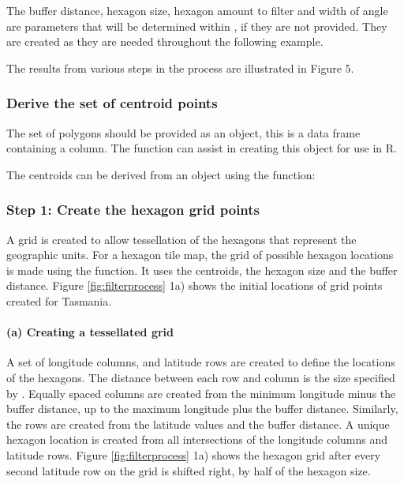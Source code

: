 The buffer distance, hexagon size, hexagon amount to filter and width of
angle are parameters that will be determined within
, if they are not provided. They are created as
they are needed throughout the following example.

The results from various steps in the process are illustrated in Figure
5.

\hypertarget{derive-the-set-of-centroid-points}{%
\subsubsection{Derive the set of centroid
points}\label{derive-the-set-of-centroid-points}}

The set of polygons should be provided as an  object, this is a
data frame containing a  column. The 
function can assist in creating this object for use in R.

The centroids can be derived from an  object using the
 function:

\hypertarget{step-1-create-the-hexagon-grid-points}{%
\subsubsection{Step 1: Create the hexagon grid
points}\label{step-1-create-the-hexagon-grid-points}}

A grid is created to allow tessellation of the hexagons that represent
the geographic units. For a hexagon tile map, the grid of possible
hexagon locations is made using the  function. It
uses the centroids, the hexagon size and the buffer distance. Figure
\ref{fig:filterprocess} 1a) shows the initial locations of grid points
created for Tasmania.

\hypertarget{a-creating-a-tessellated-grid}{%
\paragraph{(a) Creating a tessellated
grid}\label{a-creating-a-tessellated-grid}}

A set of longitude columns, and latitude rows are created to define the
locations of the hexagons. The distance between each row and column is
the size specified by . Equally spaced columns are
created from the minimum longitude minus the buffer distance, up to the
maximum longitude plus the buffer distance. Similarly, the rows are
created from the latitude values and the buffer distance. A unique
hexagon location is created from all intersections of the longitude
columns and latitude rows. Figure \ref{fig:filterprocess} 1a) shows the
hexagon grid after every second latitude row on the grid is shifted
right, by half of the hexagon size.

